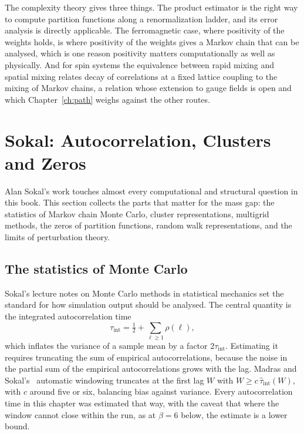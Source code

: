 The complexity theory gives three things. The product estimator is the right way to compute partition functions along a renormalization ladder, and its error analysis is directly applicable. The ferromagnetic case, where positivity of the weights holds, is where positivity of the weights gives a Markov chain that can be analysed, which is one reason positivity matters computationally as well as physically. And for spin systems the equivalence between rapid mixing and spatial mixing relates decay of correlations at a fixed lattice coupling to the mixing of Markov chains, a relation whose extension to gauge fields is open and which Chapter~\ref{ch:path} weighs against the other routes.

\section{Sokal: Autocorrelation, Clusters and Zeros}\label{ch:sokal}

Alan Sokal's work touches almost every computational and structural question in this book. This section collects the parts that matter for the mass gap: the statistics of Markov chain Monte Carlo, cluster representations, multigrid methods, the zeros of partition functions, random walk representations, and the limits of perturbation theory.

\subsection{The statistics of Monte Carlo}\label{sec:c5stats}

Sokal's lecture notes on Monte Carlo methods in statistical mechanics set the standard for how simulation output should be analysed. The central quantity is the integrated autocorrelation time
\[
\tau_{\mathrm{int}}=\tfrac12+\sum_{\ell\ge1}\rho(\ell),
\]
which inflates the variance of a sample mean by a factor $2\tau_{\mathrm{int}}$. Estimating it requires truncating the sum of empirical autocorrelations, because the noise in the partial sum of the empirical autocorrelations grows with the lag. Madras and Sokal's~\cite{MS88} automatic windowing truncates at the first lag $W$ with $W\ge c\,\hat\tau_{\mathrm{int}}(W)$, with $c$ around five or six, balancing bias against variance. Every autocorrelation time in this chapter was estimated that way, with the caveat that where the window cannot close within the run, as at $\beta=6$ below, the estimate is a lower bound.

